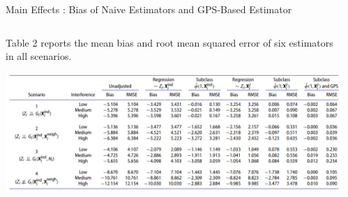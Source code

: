 \documentclass[notes,11pt, aspectratio=169]{beamer}
\begin{document}
\begin{frame}{Main Effects : Bias of Naive Estimators and GPS-Based Estimator}
\begin{columns}[T] %
\begin{column}{\textwidth}
  \begin{wideitemize}
  \item  Table 2 reports the mean bias and root mean squared error of six estimators in all scenarios.  
   \begin{table}[h]
   \centering
   \includegraphics[scale=0.45]{table2.png}
   \caption{Estimation of main effect $\tau$}
   \label{tab:tab2}
   \end{table}
  \end{wideitemize}
\end{column}%
\hfill%
\begin{column}{.38\textwidth}
  \vspace{20pt}
  \vspace{20pt}
\end{column}%
\end{columns}
\end{frame}
\end{document}
